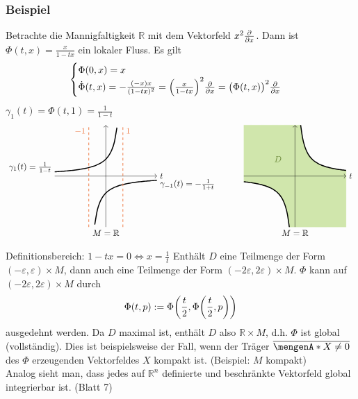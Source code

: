 \subsubsection[Beispiel: Lokaler Fluss in $\mathds{R}$]{Beispiel} %
\label{ssub:259}
Betrachte die Mannigfaltigkeit $\mathds{R}$ mit dem Vektorfeld $x^2 \frac{{\partial }}{{\partial x}} $. Dann ist $\Phi (t,x) = \frac{x}{1- tx}$ ein lokaler Fluss. Es gilt
\[
	\begin{cases}
		\Phi (0,x) = x \\
		\dot{\Phi}(t,x) = - \frac{(-x) x}{(1-tx)^2} = \enbrace*{\frac{x}{1-tx} }^2 \diff{}{x} = \enbrace[\big]{\Phi(t,x)}^2 \diff{}{x}     
	\end{cases}
\]
$\gamma_1(t)= \Phi(t,1)= \frac{1}{1-t} $
\[
	\begin{tikzpicture}[scale=0.7]
		\draw[->] (-3,0) -- (3,0) node[right]{$t$};
		\draw[->] (0,-3) node[below]{$M=\mathds{R}$} -- (0,3);
		\draw[variable=\t, domain=-3:0.65, very thick, smooth] plot ({\t}, {1 /(1-\t)});
		\draw[variable=\t, domain=-0.65:3, very thick, smooth] plot ({\t}, {-1 /(1+\t)});
		\node[left] at (-3,0.5) {$\gamma_1(t)= \frac{1}{1-t} $};
		\node[right] at(3,-0.5) {$\gamma_{-1}(t)= -\frac{1}{1+t}$};
		\draw[dashed, Sienna2, thick] (-1,-3) -- (-1,3) node[below left]{$-1$};
		\draw[dashed, Sienna2, thick] (1,-3) -- (1,3) node[below right]{$1$};
	\end{tikzpicture} \qquad \quad 
	\begin{tikzpicture}[scale=0.7]
		\draw[variable=\t, very thin, fill, DarkOliveGreen3!50, smooth] plot[domain=0.333:3] (\t, 1/\t) -- (3,-3) -- plot[domain=-0.333:-3] (\t, 1/\t) -- (-3,3) -- cycle;
		\draw[variable=\t, very thick, smooth] plot[domain=0.333:3] (\t, 1/\t)  plot[domain=-0.333:-3] (\t, 1/\t) ;
		\draw[->] (-3,0) -- (3,0) node[right]{$t$};
		\draw[->] (0,-3) node[below]{$M=\mathds{R}$} -- (0,3);
		\node[DarkOliveGreen4] at (-1,1) {$D$};
	\end{tikzpicture}
\]
Definitionsbereich: $1-tx = 0 \Leftrightarrow x = \frac{1}{t}$ 
Enthält $D$ eine Teilmenge der Form $(-\varepsilon, \varepsilon) \times M$, dann auch eine Teilmenge der Form $(-2 \varepsilon, 2 \varepsilon) \times M$.
$\Phi $ kann auf $(-2 \varepsilon, 2 \varepsilon) \times M$ durch
\[
	\Phi(t,p) := \Phi \enbrace*{\frac{t}{2}, \Phi \enbrace*{\frac{t}{2}, p }  } 
\]
ausgedehnt werden. Da $D$ maximal ist, enthält $D$ also $\mathds{R} \times M$, d.h. $\Phi $ ist global (vollständig). Dies ist beispielsweise der Fall, wenn der Träger 
$\overline{\set{X \not= 0}}$ des $\Phi$ erzeugenden Vektorfeldes $X$ kompakt ist. (Beispiel: $M$ kompakt) \\
Analog sieht man, dass jedes auf $\mathds{R}^n$ definierte und beschränkte Vektorfeld global integrierbar ist. (Blatt 7)

